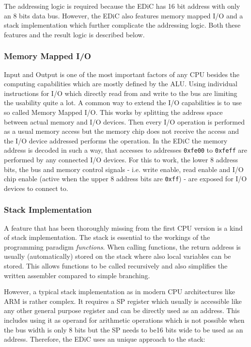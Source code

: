 The addressing logic is required because the \gls{EDiC} has 16 bit address with only an 8 bits data bus.
However, the \gls{EDiC} also features memory mapped I/O and a stack implementation which further complicate the addressing logic.
Both these features and the result logic is described below.

\subsubsection{Memory Mapped I/O}
Input and Output is one of the most important factors of any \gls{CPU} besides the computing capabilities which are mostly defined by the \gls{ALU}.
Using individual instructions for I/O which directly read from and write to the bus are limiting the usability quite a lot.
A common way to extend the I/O capabilities is to use so called Memory Mapped I/O.
This works by splitting the address space between actual memory and I/O devices.
Then every I/O operation is performed as a usual memory access but the memory chip does not receive the access and the I/O device addressed performs the operation.
In the \gls{EDiC} the memory address is decoded in such a way, that accesses to addresses \texttt{0xfe00} to \texttt{0xfeff} are performed by any connected I/O devices.
For this to work, the lower 8 address bits, the bus and memory control signals - i.e. write enable, read enable and I/O chip enable (active when the upper 8 address bits are \texttt{0xff}) - are exposed for I/O devices to connect to.
\subsubsection{Stack Implementation}\label{sec:stack}
A feature that has been thoroughly missing from the first \gls{CPU} version is a kind of stack implementation.
The stack is essential to the workings of the programming paradigm \emph{functions}.
When calling functions, the return address is usually (automatically) stored on the stack where also local variables can be stored.
This allows functions to be called recursively and also simplifies the written assembler compared to simple branching.

However, a typical stack implementation as in modern \gls{CPU} architectures like ARM is rather complex.
It requires a \gls{SP} register which usually is accessible like any other general purpose register and can be directly used as an address.
This includes using it as operand for arithmetic operations which is not possible when the bus width is only 8 bits but the \gls{SP} needs to be16 bits wide to be used as an address.
Therefore, the \gls{EDiC} uses an unique approach to the stack:

